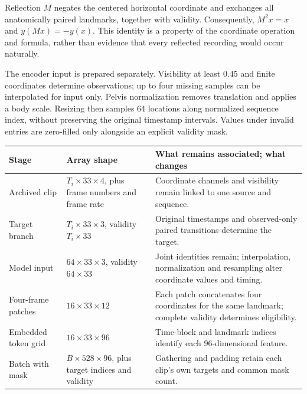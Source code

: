 \documentclass{article}
\begin{document}
Reflection \(M\) negates the centered horizontal coordinate and exchanges all anatomically paired landmarks, together with validity. Consequently, \(M^2x=x\) and \(y(Mx)=-y(x)\). This identity is a property of the coordinate operation and formula, rather than evidence that every reflected recording would occur naturally.

The encoder input is prepared separately. Visibility at least 0.45 and finite coordinates determine observations; up to four missing samples can be interpolated for input only. Pelvis normalization removes translation and applies a body scale. Resizing then samples 64 locations along normalized sequence index, without preserving the original timestamp intervals. Values under invalid entries are zero-filled only alongside an explicit validity mask.

\begin{table}[htbp]
\centering
\small
\begin{tabular}{@{}
  >{\raggedright\arraybackslash}p{}
  >{\raggedright\arraybackslash}p{}
  >{\raggedright\arraybackslash}p{}@{}}
\toprule\noalign{}
\begin{minipage}[b]{\linewidth}\raggedright
Stage
\end{minipage} & \begin{minipage}[b]{\linewidth}\raggedright
Array shape
\end{minipage} & \begin{minipage}[b]{\linewidth}\raggedright
What remains associated; what changes
\end{minipage} \\
\midrule\noalign{}

Archived clip & \(T_i\times33\times4\), plus frame numbers and frame rate & Coordinate channels and visibility remain linked to one source and sequence. \\
Target branch & \(T_i\times33\times3\), validity \(T_i\times33\) & Original timestamps and observed-only paired transitions determine the target. \\
Model input & \(64\times33\times3\), validity \(64\times33\) & Joint identities remain; interpolation, normalization and resampling alter coordinate values and timing. \\
Four-frame patches & \(16\times33\times12\) & Each patch concatenates four coordinates for the same landmark; complete validity determines eligibility. \\
Embedded token grid & \(16\times33\times96\) & Time-block and landmark indices identify each 96-dimensional feature. \\
Batch with mask & \(B\times528\times96\), plus target indices and validity & Gathering and padding retain each clip's own targets and common mask count. \\
\bottomrule
\end{tabular}
\end{table}
\end{document}
